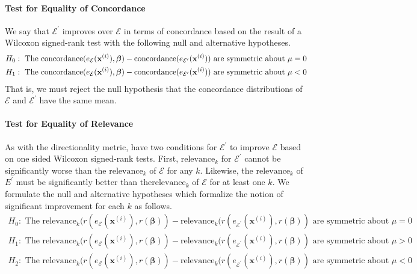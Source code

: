 \documentclass[mnsc,blindrev]{informs3}
\newcommand{\mE}{\mathcal{E}}
\begin{document}
            \paragraph{Test for Equality of Concordance}  
            We say that $\mE^\prime$ improves over $\mE$ in terms of concordance based on the result of a Wilcoxon signed-rank test with the following null and alternative hypotheses.
            \begin{align*}
                H_0: \text{ The } \text{\text{concordance}}(e_\mE(\mathbf{x}^{(i)}),\boldsymbol{\beta}) - \text{\text{concordance}}(e_{\mE^\prime}(\mathbf{x}^{(i)})) \text{ are symmetric about } \mu=0 \\
                H_1: \text{ The } \text{\text{concordance}}(e_\mE(\mathbf{x}^{(i)}),\boldsymbol{\beta}) - \text{\text{concordance}}(e_{\mE^\prime}(\mathbf{x}^{(i)})) \text{ are symmetric about } \mu<0     \end{align*}
            That is, we must reject the null hypothesis that the concordance distributions of $\mE$ and $\mE^\prime$ have the same mean.        
            \paragraph{Test for Equality of Relevance}         As with the directionality metric, have two conditions for $\mE^\prime$ to improve $\mE$ based on one sided Wilcoxon signed-rank tests. First, $\text{relevance}_k$ for $\mE^\prime$ cannot be significantly worse than the $\text{relevance}_k$ of $\mE$ for any $k$. Likewise, the $\text{relevance}_k$ of $E^\prime$ must be significantly better than the$\text{relevance}_k$ of $\mE$ for at least one $k$. We formulate the null and alternative hypotheses which formalize the notion of significant improvement for each $k$ as follows.
            \begin{align*}
            H_0: \text{ The } \text{relevance}_k(r(e_\mE(\mathbf{x}^{(i)}), r(\boldsymbol{\beta})) - \text{relevance}_k(r(e_{\mE^\prime}(\mathbf{x}^{(i)}), r(\boldsymbol{\beta})) \text{ are symmetric about } \mu=0 \\
            H_1: \text{ The }\text{relevance}_k(r(e_\mE(\mathbf{x}^{(i)}), r(\boldsymbol{\beta})) - \text{relevance}_k(r(e_{\mE^\prime}(\mathbf{x}^{(i)}), r(\boldsymbol{\beta})) \text{ are symmetric about } \mu > 0 \\
            H_2: \text{ The } \text{relevance}_k(r(e_\mE(\mathbf{x}^{(i)}), r(\boldsymbol{\beta})) - \text{relevance}_k(r(e_{\mE^\prime}(\mathbf{x}^{(i)}), r(\boldsymbol{\beta})) \text{ are symmetric about } \mu<0      \end{align*}
\end{document}
